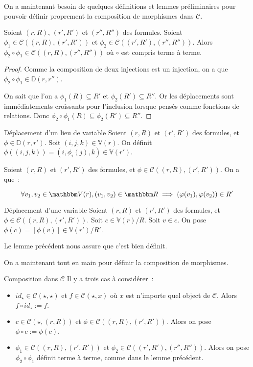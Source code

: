 \documentclass[12pt]{article}
\newcommand\V{\mathbb{V}}
\newcommand\D{\mathbb{D}}
\renewcommand\C{\mathscr{C}}
\begin{document}
On a maintenant besoin de quelques définitions et lemmes préliminaires pour pouvoir
définir proprement la composition de morphismes dans $\C$.

\begin{lem}
    Soient $(r,R)$, $(r',R')$ et $(r'',R'')$ des formules.
    Soient $\phi_1\in\C((r,R),(r',R'))$ et $\phi_2\in\C((r',R'),(r'',R''))$.
    Alors $\phi_2\circ\phi_1\in\C((r,R),(r'',R''))$ où $\circ$ est compris
    terme à terme.
\end{lem}

\begin{proof}
    Comme la composition de deux injections est un injection, on a que
    $\phi_2\circ\phi_1\in\D(r,r'')$.

    On sait que l'on a $\phi_1(R)\subseteq R'$ et $\phi_2(R')\subseteq R''$. Or
    les déplacements sont immédiatements croissants pour l'inclusion lorsque pensés
    comme fonctions de relations.
    Donc $\phi_2\circ\phi_1(R)\subseteq\phi_2(R')\subseteq R''$.
\end{proof}

\begin{defi}{Déplacement d'un lieu de variable}
    Soient $(r,R)$ et $(r',R')$ des formules, et $\phi\in\D(r,r')$.
    Soit $(i,j,k)\in\V(r)$. On définit $\phi((i,j,k)) = (i, \phi_i(j), k)\in\V(r')$.
\end{defi}

\begin{lem}
    Soient $(r,R)$ et $(r',R')$ des formules, et $\phi\in\C((r,R),(r',R'))$.
    On a que~:
    
    \[\forall v_1,v_2\in\V(r), (v_1,v_2)\in\R\implies (\phi(v_1),\phi(v_2))\in R'\]
\end{lem}

\begin{defi}{Déplacement d'une variable}
    Soient $(r,R)$ et $(r',R')$ des formules, et $\phi\in\C((r,R),(r',R'))$.
    Soit $c\in\V(r)/R$. Soit $v\in c$. On pose $\phi(c) = [\phi(v)]\in\V(r')/R'$.

    Le lemme précédent nous assure que c'est bien définit.
\end{defi}

On a maintenant tout en main pour définir la composition de morphismes.

\begin{defi}{Composition dans $\C$}
    Il y a trois cas à considérer~:\begin{itemize}
        \item $id_\star\in\C(\star,\star)$ et $f\in\C(\star, x)$ où $x$ est n'importe
            quel object de $\C$. Alors $f\circ id_\star := f$.
        \item $c\in\C(\star, (r,R))$ et $\phi\in\C((r,R), (r',R'))$. Alors
            on pose $\phi\circ c := \phi(c)$.
        \item $\phi_1\in\C((r,R),(r',R'))$ et $\phi_2\in\C((r',R'),(r'',R''))$. Alors
            on pose $\phi_2\circ\phi_1$ définit terme à terme, comme dans le lemme
            précédent.
    \end{itemize}
\end{defi}
\end{document}
